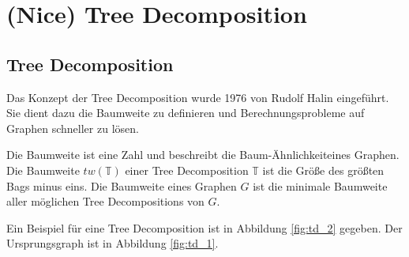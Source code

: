 %
%
%
\chapter{(Nice) Tree Decomposition}
\label{c:ntd} %

\section{Tree Decomposition}
\label{sec:ntd_td}

Das Konzept der Tree Decomposition wurde 1976 von Rudolf Halin\cite{Halin1976} eingeführt. Sie dient dazu die Baumweite zu definieren und Berechnungsprobleme auf Graphen schneller zu lösen.

Die Baumweite ist eine Zahl und beschreibt die \glqq Baum-Ähnlichkeit\grqq eines Graphen. Die Baumweite $tw(\mathbb{T})$ einer Tree Decomposition $\mathbb{T}$ ist die Größe des größten Bags minus eins. Die Baumweite eines Graphen $G$ ist die minimale Baumweite aller möglichen Tree Decompositions von $G$.

Ein Beispiel für eine Tree Decomposition ist in Abbildung \ref{fig:td_2} gegeben. Der Ursprungsgraph ist in Abbildung \ref{fig:td_1}.


